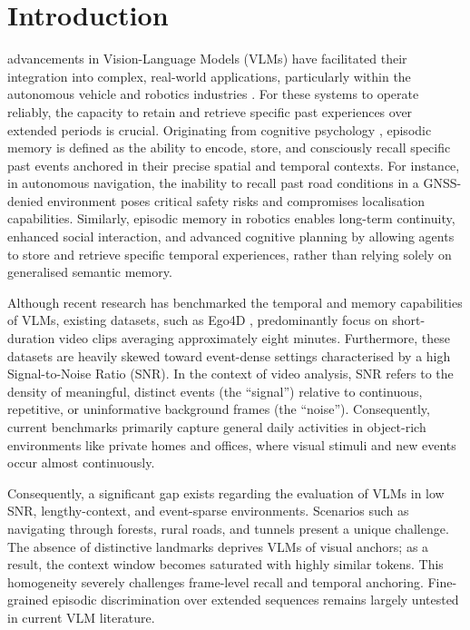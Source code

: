 \documentclass[journal]{IEEEtran}
\begin{document}
\section{Introduction}
\label{sec:introduction}

 advancements in Vision-Language Models (VLMs) have facilitated their integration into complex, real-world applications, particularly within the autonomous vehicle and robotics industries \cite{kodiak2023}. For these systems to operate reliably, the capacity to retain and retrieve specific past experiences over extended periods is crucial. Originating from cognitive psychology \cite{tulving1972episodic}, episodic memory is defined as the ability to encode, store, and consciously recall specific past events anchored in their precise spatial and temporal contexts. For instance, in autonomous navigation, the inability to recall past road conditions in a GNSS-denied environment poses critical safety risks and compromises localisation capabilities. Similarly, episodic memory in robotics enables long-term continuity, enhanced social interaction, and advanced cognitive planning by allowing agents to store and retrieve specific temporal experiences, rather than relying solely on generalised semantic memory.

Although recent research has benchmarked the temporal and memory capabilities of VLMs, existing datasets, such as Ego4D \cite{ego4d}, predominantly focus on short-duration video clips averaging approximately eight minutes. Furthermore, these datasets are heavily skewed toward event-dense settings characterised by a high Signal-to-Noise Ratio (SNR). In the context of video analysis, SNR refers to the density of meaningful, distinct events (the ``signal'') relative to continuous, repetitive, or uninformative background frames (the ``noise''). Consequently, current benchmarks primarily capture general daily activities in object-rich environments like private homes and offices, where visual stimuli and new events occur almost continuously.

Consequently, a significant gap exists regarding the evaluation of VLMs in low SNR, lengthy-context, and event-sparse environments. Scenarios such as navigating through forests, rural roads, and tunnels present a unique challenge. The absence of distinctive landmarks deprives VLMs of visual anchors; as a result, the context window becomes saturated with highly similar tokens. This homogeneity severely challenges frame-level recall and temporal anchoring. Fine-grained episodic discrimination over extended sequences remains largely untested in current VLM literature.
\end{document}
